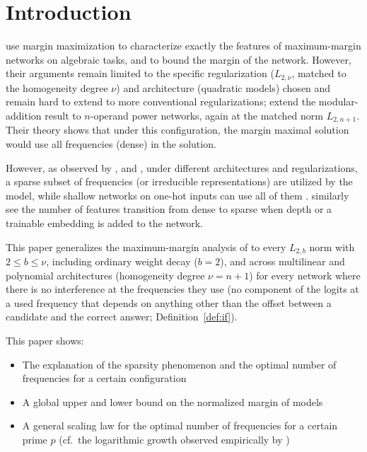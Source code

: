 \section{Introduction}\label{sec:intro}

\citet{morwani2024feature} use margin maximization \citep{wei2019regularization,lyu2020gradient} to characterize exactly the features of maximum-margin networks on algebraic tasks, and to bound the margin of the network. However, their arguments remain limited to the specific regularization ($L_{2, \nu}$, matched to the homogeneity degree $\nu$) and architecture (quadratic models) chosen and remain hard to extend to more conventional regularizations; \citet{li2025nsum} extend the modular-addition result to $n$-operand power networks, again at the matched norm $L_{2,n+1}$. Their theory shows that under this configuration, the margin maximal solution would use all frequencies (dense) in the solution.

However, as observed by \citet{nanda2023progress}, \citet{chughtai2023toy} and \citet{zhong2023clock}, under different architectures and regularizations, a sparse subset of frequencies (or irreducible representations) are utilized by the model, while shallow networks on one-hot inputs can use all of them \citep{morwani2024feature,mccracken2025}. \citet{mccracken2025} similarly see the number of features transition from dense to sparse when depth or a trainable embedding is added to the network.

This paper generalizes the maximum-margin analysis of \citet{morwani2024feature} to every $L_{2,b}$ norm with $2\le b\le\nu$, including ordinary weight decay ($b=2$), and across multilinear and polynomial architectures (homogeneity degree $\nu=n+1$) for every network where there is no interference at the frequencies they use (no component of the logits at a used frequency that depends on anything other than the offset between a candidate and the correct answer; Definition~\ref{def:if}).

This paper shows:
\begin{itemize}[label={}]
  \item The explanation of the sparsity phenomenon and the optimal number of frequencies for a certain configuration
  \item A global upper and lower bound on the normalized margin of models
  \item A general scaling law for the optimal number of frequencies for a certain prime $p$ (cf.\ the logarithmic growth observed empirically by \citet{mccracken2025})
\end{itemize}